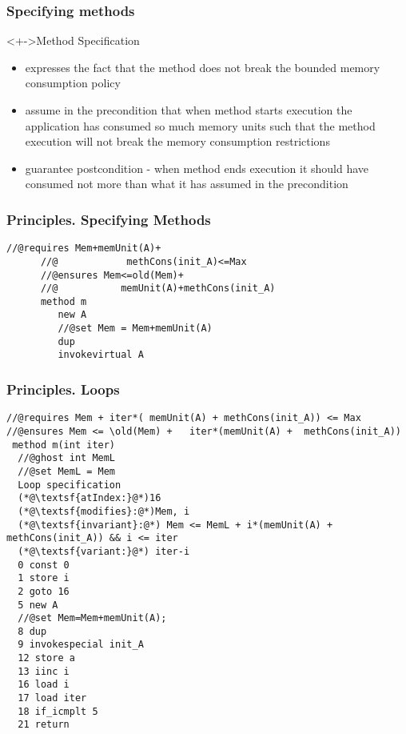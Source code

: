 \documentclass{beamer}
\begin{document}
\begin{frame} \frametitle{Specifying methods}
  \begin{block}<+->{Method Specification}
    \begin{itemize}
      \item  <1->{ expresses the fact that the method does not break the bounded memory consumption policy }
      
      \item  <2->{  assume in the precondition that  when method starts execution the application has consumed so much memory units such that the method execution 
 will not break the memory consumption restrictions}
      \item  <3->{ guarantee postcondition -  when method ends execution it should have consumed not more than what it has assumed in the precondition  }
     \end{itemize}
  \end{block}
\end{frame}

\begin{frame}\frametitle{Principles. Specifying Methods}
  \begin{Example}{
      \begin{lstlisting}[language=jvmis]
      //@requires Mem+memUnit(A)+
      //@            methCons(init_A)<=Max
      //@ensures Mem<=old(Mem)+
      //@           memUnit(A)+methCons(init_A)
      method m
         new A
         //@set Mem = Mem+memUnit(A)
         dup
         invokevirtual A
      \end{lstlisting}         
       }
  \end{Example} 
\end{frame}


\begin{frame}\frametitle{Principles. Loops}
 \begin{Example}{ {\tiny 
 \begin{lstlisting}[language=jvmis]
//@requires Mem + iter*( memUnit(A) + methCons(init_A)) <= Max
//@ensures Mem <= \old(Mem) +   iter*(memUnit(A) +  methCons(init_A))   
 method m(int iter)
  //@ghost int MemL
  //@set MemL = Mem
  Loop specification
  (*@\textsf{atIndex:}@*)16
  (*@\textsf{modifies}:@*)Mem, i
  (*@\textsf{invariant}:@*) Mem <= MemL + i*(memUnit(A) + methCons(init_A)) && i <= iter
  (*@\textsf{variant:}@*) iter-i
  0 const 0
  1 store i
  2 goto 16 
  5 new A
  //@set Mem=Mem+memUnit(A);
  8 dup
  9 invokespecial init_A
  12 store a
  13 iinc i
  16 load i
  17 load iter
  18 if_icmplt 5 
  21 return
 \end{lstlisting}}  
}\end{Example} 
\end{frame}
  
\end{document}
